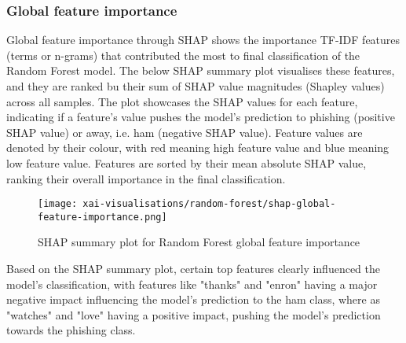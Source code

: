 

\subsubsection*{Global feature importance}
Global feature importance through SHAP shows the importance TF-IDF features (terms or n-grams) that contributed the most to final classification of the Random Forest model. The below SHAP summary plot visualises these features, and they are ranked bu their sum of SHAP value magnitudes (Shapley values) across all samples. The plot showcases the SHAP values for each feature, indicating if a feature's value pushes the model's prediction to phishing (positive SHAP value) or away, i.e. ham (negative SHAP value). Feature values are denoted by their colour, with red meaning high feature value and blue meaning low feature value. Features are sorted by their mean absolute SHAP value, ranking their overall importance in the final classification.

\begin{figure}[H]
  \begin{center}
    \texttt{[image: xai-visualisations/random-forest/shap-global-feature-importance.png]}
    \caption{SHAP summary plot for Random Forest global feature importance}
  \end{center}
\end{figure}

\noindent Based on the SHAP summary plot, certain top features clearly influenced the model's classification, with features like "thanks" and "enron" having a major negative impact influencing the model's prediction to the ham class, where as "watches" and "love" having a positive impact, pushing the model's prediction towards the phishing class.
